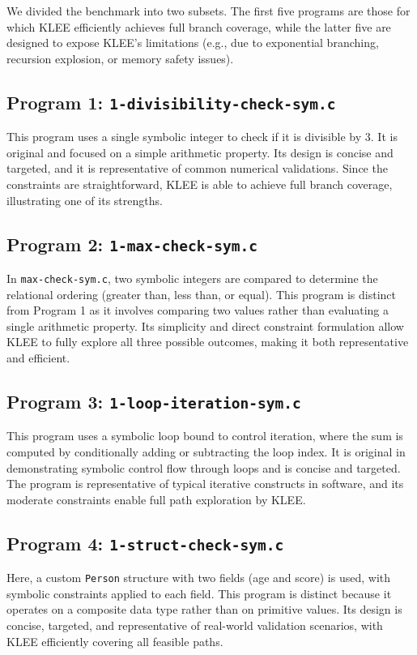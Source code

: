 \documentclass[conference]{IEEEtran}
\begin{document}
We divided the benchmark into two subsets. The first five programs are those for which KLEE efficiently achieves full branch coverage, while the latter five are designed to expose KLEE’s limitations (e.g., due to exponential branching, recursion explosion, or memory safety issues).

\subsection{Program 1: \texttt{1-divisibility-check-sym.c}}
This program uses a single symbolic integer to check if it is divisible by 3. It is original and focused on a simple arithmetic property. Its design is concise and targeted, and it is representative of common numerical validations. Since the constraints are straightforward, KLEE is able to achieve full branch coverage, illustrating one of its strengths.

\subsection{Program 2: \texttt{1-max-check-sym.c}}
In \texttt{max-check-sym.c}, two symbolic integers are compared to determine the relational ordering (greater than, less than, or equal). This program is distinct from Program 1 as it involves comparing two values rather than evaluating a single arithmetic property. Its simplicity and direct constraint formulation allow KLEE to fully explore all three possible outcomes, making it both representative and efficient.

\subsection{Program 3: \texttt{1-loop-iteration-sym.c}}
This program uses a symbolic loop bound to control iteration, where the sum is computed by conditionally adding or subtracting the loop index. It is original in demonstrating symbolic control flow through loops and is concise and targeted. The program is representative of typical iterative constructs in software, and its moderate constraints enable full path exploration by KLEE.

\subsection{Program 4: \texttt{1-struct-check-sym.c}}
Here, a custom \texttt{Person} structure with two fields (age and score) is used, with symbolic constraints applied to each field. This program is distinct because it operates on a composite data type rather than on primitive values. Its design is concise, targeted, and representative of real-world validation scenarios, with KLEE efficiently covering all feasible paths.
\end{document}
